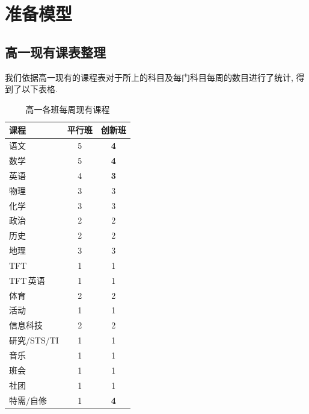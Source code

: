 \documentclass[a4paper]{article}
\begin{document}
\section{准备模型}
 \subsection{高一现有课表整理}
  我们依据高一现有的课程表对于所上的科目及每门科目每周的数目进行了统计, 得到了以下表格.
  \begin{table}[H]
  \centering
  \begin{tabular}{|l|c|c|}
  \hline
  \bf 课程 & \bf 平行班 & \bf 创新班\\\hline
  语文 & 5 & \bf 4\\\hline
  数学 & 5 & \bf 4\\\hline
  英语 & 4 & \bf 3\\\hline
  物理 & 3 & 3\\\hline
  化学 & 3 & 3\\\hline
  政治 & 2 & 2\\\hline
  历史 & 2 & 2\\\hline
  地理 & 3 & 3\\\hline
  TFT & 1 & 1\\\hline
  TFT\,英语 & 1 & 1\\\hline
  体育 & 2 & 2\\\hline
  活动 & 1 & 1\\\hline
  信息科技 & 2 & 2\\\hline
  研究/STS/TI & 1 & 1\\\hline
  音乐 & 1 & 1\\\hline
  班会 & 1 & 1\\\hline
  社团 & 1 & 1\\\hline
  特需/自修 & 1 & \bf 4\\\hline
  \end{tabular}
  \caption{高一各班每周现有课程}
  \end{table}
\end{document}
